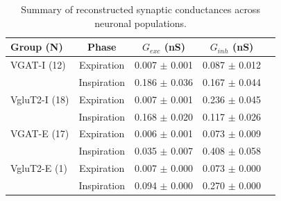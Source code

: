 \begin{table}[htbp]
\centering
\caption{Summary of reconstructed synaptic conductances across neuronal populations.}
\label{tab:conductance_summary}
\begin{tabular}{lcccc}
\hline
Group (N) & Phase & $G_{exc}$ (nS) & $G_{inh}$ (nS) \\
\hline
VGAT-I (12) & Expiration & 0.007 $\pm$ 0.001 & 0.087 $\pm$ 0.012 \\
& Inspiration & 0.186 $\pm$ 0.036 & 0.167 $\pm$ 0.044 \\
\hline
VgluT2-I (18) & Expiration & 0.007 $\pm$ 0.001 & 0.236 $\pm$ 0.045 \\
& Inspiration & 0.168 $\pm$ 0.020 & 0.117 $\pm$ 0.026 \\
\hline
VGAT-E (17) & Expiration & 0.006 $\pm$ 0.001 & 0.073 $\pm$ 0.009 \\
& Inspiration & 0.035 $\pm$ 0.007 & 0.408 $\pm$ 0.058 \\
\hline
VgluT2-E (1) & Expiration & 0.007 $\pm$ 0.000 & 0.073 $\pm$ 0.000 \\
& Inspiration & 0.094 $\pm$ 0.000 & 0.270 $\pm$ 0.000 \\
\hline
\end{tabular}
\end{table}